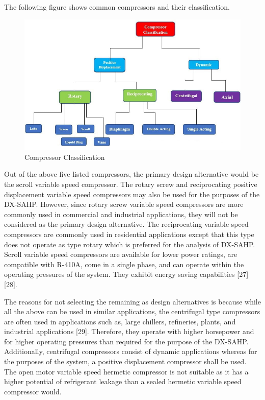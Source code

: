 \medskip
The following figure shows common compressors and their classification.

\medskip
\begin{figure}[ht]
    \centering
    \includegraphics[width=\textwidth]{images/compressor_types.jpg}
    \caption{Compressor Classification}
\end{figure}

\medskip
Out of the above five listed compressors, the primary design alternative would be the scroll variable speed compressor. The rotary screw and reciprocating positive displacement variable speed compressors may also be used for the purposes of the DX-SAHP. However, since rotary screw variable speed compressors are more commonly used in commercial and industrial applications, they will not be considered as the primary design alternative. The reciprocating variable speed compressors are commonly used in residential applications except that this type does not operate as type rotary which is preferred for the analysis of DX-SAHP. Scroll variable speed compressors are available for lower power ratings, are compatible with R-410A, come in a single phase, and can operate within the operating pressures of the system. They exhibit energy saving capabilities [27] [28].

\medskip
The reasons for not selecting the remaining as design alternatives is because while all the above can be used in similar applications, the centrifugal type compressors are often used in applications such as, large chillers, refineries, plants, and industrial applications [29]. Therefore, they operate with higher horsepower and for higher operating pressures than required for the purpose of the DX-SAHP. Additionally, centrifugal compressors consist of dynamic applications whereas for the purposes of the system, a positive displacement compressor shall be used. The open motor variable speed hermetic compressor is not suitable as it has a higher potential of refrigerant leakage than a sealed hermetic variable speed compressor would.

